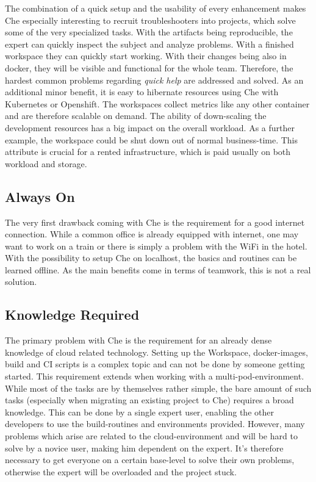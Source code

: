 \documentclass[english,utf8]{lni}
\begin{document}
The combination of a quick setup and the usability of every enhancement makes Che especially interesting to recruit troubleshooters into projects, which solve some of the very specialized tasks.  
With  the  artifacts  being  reproducible,  the  expert  can quickly inspect the subject and analyze problems.
With a finished workspace they can quickly start working. 
With their changes being also in docker, they will be visible and functional for the whole team.
Therefore,  the  hardest  common  problems  regarding \textit{quick help} are addressed and solved. 
As an additional minor benefit, it is easy to hibernate resources  using  Che  with  Kubernetes  or  Openshift.
The workspaces collect metrics like any other container and are therefore scalable on demand. 
The ability of down-scaling the development resources has a big impact on the overall 
workload. 
As a further example, the workspace could be shut down out of normal business-time. This attribute is crucial for a rented infrastructure, which is paid usually on both workload and storage. 
\subsection{Always On}
The very first drawback coming with Che is the requirement for a good internet connection. 
While a common office is already equipped with internet, one may want to work on a train or there is simply a problem with the WiFi in the hotel.
With the possibility to setup Che on localhost, the basics and routines can be learned offline. As the main benefits come in terms of teamwork, this is not a real solution.
\subsection{Knowledge Required}
The primary problem with Che is the requirement for an already dense knowledge of cloud related technology.
Setting up the Workspace, docker-images, build and CI scripts is a complex topic and can not be done by someone getting started. 
This requirement extends when working with a multi-pod-environment. 
While most of the tasks are by themselves rather simple, the bare amount of such tasks (especially when migrating an existing project to Che) requires a broad knowledge.
This can be done by a single expert user, enabling the other developers  to  use  the  build-routines and  environments provided. 
However, many problems which arise are related to the cloud-environment and will be hard to solve by a novice user, making him dependent on the expert. 
It's therefore necessary to get everyone on a certain base-level to solve their own problems, otherwise the expert will be overloaded and the project stuck.  
\end{document}
